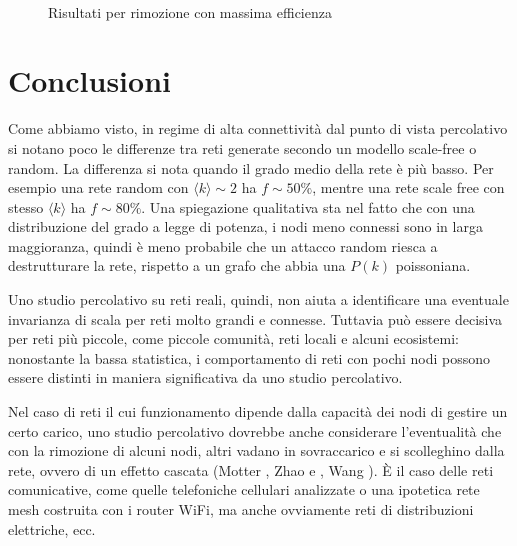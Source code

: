 \begin{figure}[p!]
	$\;$
	\caption[Risultati attacco.]{Risultati per rimozione con massima efficienza}
	\label{fig:atak}
\end{figure}
\clearpage
\section{Conclusioni}
Come abbiamo visto, in regime di alta connettività dal punto di vista percolativo si notano poco le differenze tra reti generate secondo un modello scale-free o random. La differenza si nota quando il grado medio della rete è più basso. Per esempio una rete random con $\langle k \rangle \sim 2$ ha $f\sim 50\%$, mentre una rete scale free con stesso $\langle k \rangle$ ha $f\sim 80\%$. Una spiegazione qualitativa sta nel fatto che con una distribuzione del grado a legge di potenza, i nodi meno connessi sono in larga maggioranza, quindi è meno probabile che un attacco random riesca a destrutturare la rete, rispetto a un grafo che abbia una $P(k)$ poissoniana.

Uno studio percolativo su reti reali, quindi, non aiuta a identificare una eventuale invarianza di scala per reti molto grandi e connesse. Tuttavia può essere decisiva per reti più piccole, come piccole comunità, reti locali e alcuni ecosistemi: nonostante la bassa statistica, i comportamento di reti con pochi nodi possono essere distinti in maniera significativa da uno studio percolativo.

Nel caso di reti il cui funzionamento dipende dalla capacità dei nodi di gestire un certo carico, uno studio percolativo dovrebbe anche considerare l'eventualità che con la rimozione di alcuni nodi, altri vadano in sovraccarico e si scolleghino dalla rete, ovvero di un effetto cascata (Motter \citeyear{Motter2002}, Zhao \citeyear{Zhao2004} e \citeyear{Zhao2005}, Wang \citeyear{Wang2009}). È il caso delle reti comunicative, come quelle telefoniche cellulari analizzate o una ipotetica rete mesh costruita con i router WiFi, ma anche ovviamente reti di distribuzioni elettriche, ecc.

